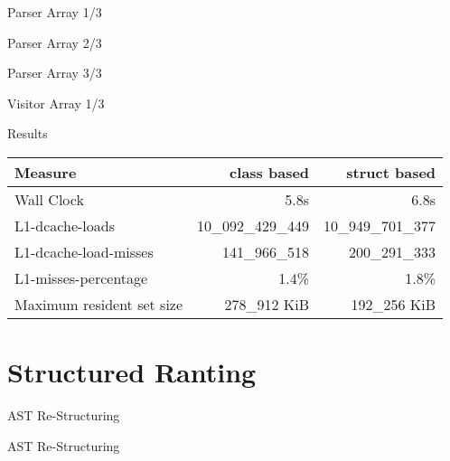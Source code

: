 \documentclass[aspectratio=169,notes]{beamer}
\begin{document}
	\begin{frame}[fragile]{Parser Array 1/3}
		
	\end{frame}

	\begin{frame}[fragile]{Parser Array 2/3}
		
	\end{frame}

	\begin{frame}[fragile]{Parser Array 3/3}
		
	\end{frame}

	\begin{frame}[fragile]{Visitor Array 1/3}
		
	\end{frame}

	\begin{frame}[fragile]{Results}
		\centering
		\begin{tabular}{l r r}
			Measure & class based & struct based \\ \hline
			Wall Clock & 5.8s & 6.8s \\
			L1-dcache-loads & 10\_092\_429\_449 & 10\_949\_701\_377  \\
			L1-dcache-load-misses & 141\_966\_518 & 200\_291\_333 \\
			L1-misses-percentage & 1.4\% & 1.8\% \\
			Maximum resident set size & 278\_912 KiB & 192\_256 KiB
		\end{tabular}
	\end{frame}

	\section{Structured Ranting}

	\begin{frame}[fragile]{AST Re-Structuring}
		
	\end{frame}

	\begin{frame}[fragile]{AST Re-Structuring}
		
	\end{frame}
\end{document}
